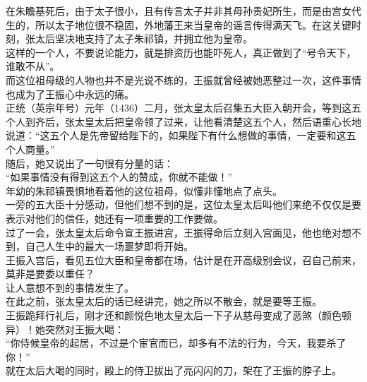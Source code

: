 \begin{multicols}{\theparacolNo}
在朱瞻基死后，由于太子很小，且有传言太子并非其母孙贵妃所生，而是由宫女代生的，所以太子地位很不稳固，外地藩王来当皇帝的谣言传得满天飞。在这关键时刻，张太后坚决地支持了太子朱祁镇，并拥立他为皇帝。\\

这样的一个人，不要说论能力，就是排资历也能吓死人，真正做到了“号令天下，谁敢不从”。\\

而这位祖母级的人物也并不是光说不练的，王振就曾经被她恶整过一次，这件事情也成为了王振心中永远的痛。\\

正统（英宗年号）元年（1436）二月，张太皇太后召集五大臣入朝开会，等到这五个人到齐后，张太皇太后把皇帝领了过来，让他看清楚这五个人，然后语重心长地说道：“这五个人是先帝留给陛下的，如果陛下有什么想做的事情，一定要和这五个人商量。”\\

随后，她又说出了一句很有分量的话：\\

“如果事情没有得到这五个人的赞成，你就不能做！”\\

年幼的朱祁镇畏惧地看着他的这位祖母，似懂非懂地点了点头。\\

一旁的五大臣十分感动，但他们想不到的是，这位太皇太后叫他们来绝不仅仅是要表示对他们的信任，她还有一项重要的工作要做。\\

过了一会，张太皇太后命令宣王振进宫，王振得命后立刻入宫面见，他也绝对想不到，自己人生中的最大一场噩梦即将开始。\\

王振入宫后，看见五位大臣和皇帝都在场，估计是在开高级别会议，召自己前来，莫非是要委以重任？\\

让人意想不到的事情发生了。\\

在此之前，张太皇太后的话已经讲完，她之所以不散会，就是要等王振。\\

王振跪拜行礼后，刚才还和颜悦色地太皇太后一下子从慈母变成了恶煞（颜色顿异）！她突然对王振大喝：\\

“你侍候皇帝的起居，不过是个宦官而已，却多有不法的行为，今天，我要杀了你！”\\

就在太后大喝的同时，殿上的侍卫拔出了亮闪闪的刀，架在了王振的脖子上。\\


\end{multicols}
